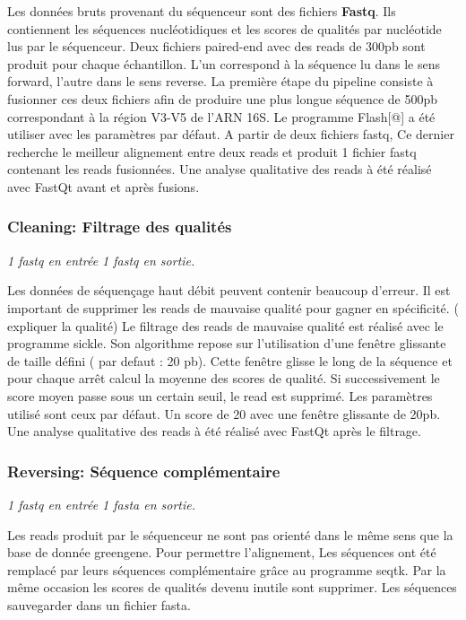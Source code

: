 \documentclass[12pt,a4paper]{article}
\begin{document}
Les données bruts provenant du séquenceur sont des fichiers \textbf{Fastq}. Ils contiennent les séquences nucléotidiques et les scores de qualités par nucléotide lus par le séquenceur. Deux fichiers paired-end avec des reads de 300pb sont produit pour chaque échantillon. L’un correspond à la séquence lu dans le sens forward, l’autre dans le sens reverse.
La première étape du pipeline consiste à fusionner ces deux fichiers afin de produire une plus longue séquence de 500pb correspondant à la région V3-V5 de l’ARN 16S.
Le programme Flash[@] a été utiliser avec les paramètres par défaut. A partir de deux fichiers fastq, Ce dernier recherche le meilleur alignement entre deux reads et produit 1 fichier fastq contenant les reads fusionnées.
Une analyse qualitative des reads à été réalisé avec FastQt\citep{Beck} avant et après fusions.

\subsubsection{Cleaning: Filtrage des qualités}\begin{center}\emph{1 fastq en entrée 1 fastq en sortie. } \end{center}

Les données de séquençage haut débit peuvent contenir beaucoup d'erreur. Il est important de supprimer les reads de mauvaise qualité pour gagner en spécificité. ( expliquer la qualité)
Le filtrage des reads de mauvaise qualité est réalisé avec le programme sickle. Son algorithme repose sur l'utilisation d'une fenêtre glissante de taille défini ( par defaut : 20 pb). Cette fenêtre glisse le long de la séquence et pour chaque arrêt calcul la moyenne des scores de qualité. Si successivement le score moyen passe sous un certain seuil, le read est supprimé. Les paramètres utilisé sont ceux par défaut. Un score de 20 avec une fenêtre glissante de 20pb. 
Une analyse qualitative des reads à été réalisé avec FastQt\citep{Beck} après le filtrage. 


\subsubsection{Reversing: Séquence complémentaire}\begin{center}\emph{1 fastq en entrée 1 fasta en sortie. } \end{center}

Les reads produit par le séquenceur ne sont pas orienté dans le même sens que la base de donnée greengene. Pour permettre l'alignement, Les séquences ont été remplacé par leurs séquences complémentaire grâce au programme seqtk. 
Par la même occasion les scores de qualités devenu inutile sont supprimer. Les séquences sauvegarder dans un fichier fasta. 
\end{document}
